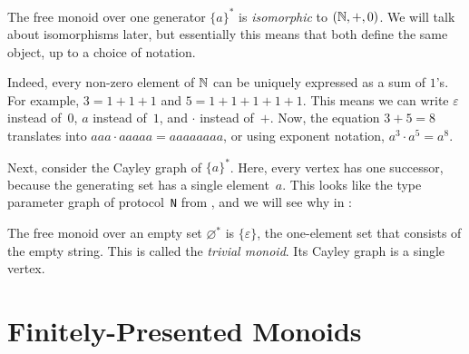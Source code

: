 \documentclass[../generics]{subfiles}
\begin{document}
\begin{example}\label{monoid n graph}
The free monoid over one generator $\{a\}^*$ is \emph{isomorphic} to $(\mathbb{N},+,0)$. We will talk about isomorphisms later, but essentially this means that both define the same object, up to a choice of notation.

Indeed, every non-zero element of $\mathbb{N}$ can be uniquely expressed as a sum of $1$'s. For example, $3=1+1+1$ and $5=1+1+1+1+1$. This means we can write $\varepsilon$ instead of~$0$, $a$ instead of~$1$, and $\cdot$ instead of~$+$. Now, the equation $3+5=8$ translates into $aaa\cdot aaaaa=aaaaaaaa$, or using exponent notation, $a^3\cdot a^5 = a^8$.

Next, consider the Cayley graph of $\{a\}^*$. Here, every vertex has one successor, because the generating set has a single element~$a$. This looks like the type parameter graph of protocol~\texttt{N} from , and we will see why in :

\begin{center}
\end{center}
\end{example}

\begin{example}
The free monoid over an empty set $\varnothing^*$ is $\{\varepsilon\}$, the one-element set that consists of the empty string. This is called the \emph{trivial monoid}. Its Cayley graph is a single vertex.
\end{example}

\section{Finitely-Presented Monoids}\label{finitely presented monoids}
\end{document}
